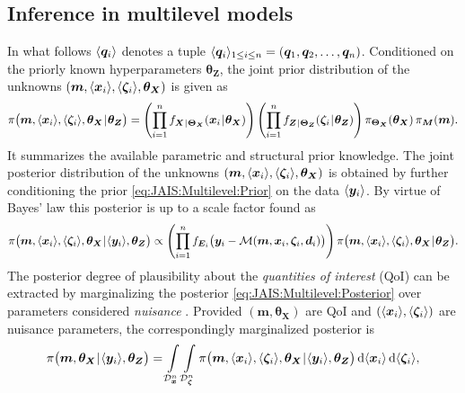 \subsection{Inference in multilevel models} \label{sec:JAIS:Multilevel:Inference}
In what follows \(\langle{\bm{q}_i}\rangle\) denotes a tuple \(\langle{\bm{q}_i}\rangle_{1 \leq i \leq n} = (\bm{q}_1,\bm{q}_2,\ldots,\bm{q}_n)\).
Conditioned on the priorly known hyperparameters \(\bm{\theta}_{\bm{Z}}\), the joint prior distribution of the unknowns \((\bm{m},\langle{\bm{x}_i}\rangle,\langle{\bm{\zeta}_i}\rangle,\bm{\theta}_{\bm{X}})\) is given as
\begin{equation} \label{eq:JAIS:Multilevel:Prior}
  \pi \big( \bm{m},\tuple{\bm{x}_i},\tuple{\bm{\zeta}_i},\bm{\theta}_{\bm{X}} \cond \bm{\theta}_{\bm{Z}} \big)
  = \left( \prod\limits_{i=1}^n f_{\bm{X} \cond \bm{\Theta}_{\bm{X}}}(\bm{x}_i \cond \bm{\theta}_{\bm{X}}) \right)
  \left( \prod\limits_{i=1}^n f_{\bm{Z} \cond \bm{\Theta}_{\bm{Z}}}(\bm{\zeta}_i \cond \bm{\theta}_{\bm{Z}}) \right)
  \pi_{\bm{\Theta}_{\bm{X}}} (\bm{\theta}_{\bm{X}})\, \pi_{\bm{M}} (\bm{m}).
\end{equation}
It summarizes the available parametric and structural prior knowledge.
The joint posterior distribution of the unknowns \((\bm{m},\langle{\bm{x}_i}\rangle,\langle{\bm{\zeta}_i}\rangle,\bm{\theta}_{\bm{X}})\)
is obtained by further conditioning the prior \cref{eq:JAIS:Multilevel:Prior} on the data \(\langle{\bm{y}_i}\rangle\).
By virtue of Bayes' law this posterior is up to a scale factor found as
\begin{equation} \label{eq:JAIS:Multilevel:Posterior}
  \pi \big( \bm{m},\langle{\bm{x}_i}\rangle,\langle{\bm{\zeta}_i}\rangle,\bm{\theta}_{\bm{X}} {\:\!}|{\:\!} \langle{\bm{y}_i}\rangle,\bm{\theta}_{\bm{Z}} \big)
  \propto \left( \prod\limits_{i=1}^n f_{\bm{E}_i} \big( \bm{y}_i-\mathcal{M}(\bm{m},\bm{x}_i,\bm{\zeta}_i,\bm{d}_i) \big) \right)
  \pi \big( \bm{m},\langle{\bm{x}_i}\rangle,\langle{\bm{\zeta}_i}\rangle,\bm{\theta}_{\bm{X}} {\:\!}|{\:\!} \bm{\theta}_{\bm{Z}} \big).
\end{equation}
The posterior degree of plausibility about the \textit{quantities of interest} (QoI) can be extracted
by marginalizing the posterior \cref{eq:JAIS:Multilevel:Posterior} over parameters considered \textit{nuisance} \cite{Statistics:Basu1977:a,Statistics:Dawid1980:a}.
Provided \((\bm{m},\bm{\theta}_{\bm{X}})\) are QoI and \((\langle{\bm{x}_i}\rangle,\langle{\bm{\zeta}_i}\rangle)\) are nuisance parameters, the correspondingly marginalized posterior is
\begin{equation} \label{eq:JAIS:Multilevel:MarginalPosterior}
  \pi \big( \bm{m},\bm{\theta}_{\bm{X}} {\:\!}|{\:\!} \langle{\bm{y}_i}\rangle,\bm{\theta}_{\bm{Z}} \big) = 
  \int\limits_{\mathcal{D}_{\bm{x}}^n} \int\limits_{\mathcal{D}_{\bm{\zeta}}^n}
  \pi \big( \bm{m},\langle{\bm{x}_i}\rangle,\langle{\bm{\zeta}_i}\rangle,\bm{\theta}_{\bm{X}} {\:\!}|{\:\!} \langle{\bm{y}_i}\rangle,\bm{\theta}_{\bm{Z}} \big)
  \, \mathrm{d} \langle{\bm{x}_i}\rangle \, \mathrm{d} \langle{\bm{\zeta}_i}\rangle,
\end{equation}
